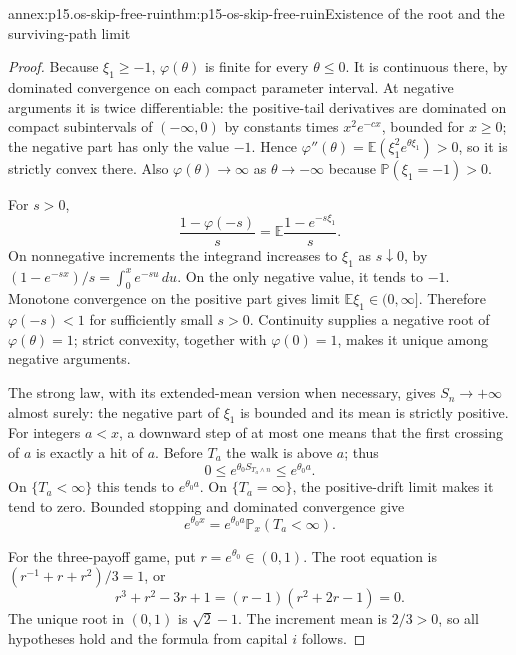 \begin{annexitem}{annex:p15.os-skip-free-ruin}{thm:p15-os-skip-free-ruin}{Existence of the root and the surviving-path limit}
\begin{proof}
Because \(\xi_1\geq-1\), \(\varphi(\theta)\) is finite
for every \(\theta\leq0\). It is continuous there, by
dominated convergence on each compact parameter interval.
At negative arguments it is twice differentiable: the
positive-tail derivatives are dominated on compact subintervals
of \((-\infty,0)\) by constants times \(x^2e^{-cx}\),
bounded for \(x\geq0\); the negative part has only the value
\(-1\). Hence
\(\varphi''(\theta)=\mathbb E(\xi_1^2e^{\theta\xi_1})>0\),
so it is strictly convex there.
Also \(\varphi(\theta)\to\infty\) as \(\theta\to-\infty\)
because \(\mathbb P(\xi_1=-1)>0\).

For \(s>0\),
\[
 \frac{1-\varphi(-s)}s
 =\mathbb E\frac{1-e^{-s\xi_1}}s.
 \]
On nonnegative increments the integrand increases to \(\xi_1\)
as \(s\downarrow0\), by
\((1-e^{-sx})/s=\int_0^x e^{-su}\,du\).
On the only negative value, it tends to \(-1\).
Monotone convergence on the positive part gives limit
\(\mathbb E\xi_1\in(0,\infty]\).
Therefore \(\varphi(-s)<1\) for sufficiently small \(s>0\).
Continuity supplies a negative root of \(\varphi(\theta)=1\);
strict convexity, together with \(\varphi(0)=1\), makes it
unique among negative arguments.

The strong law, with its extended-mean version when necessary,
gives \(S_n\to+\infty\) almost surely: the negative part of
\(\xi_1\) is bounded and its mean is strictly positive.
For integers \(a<x\), a downward step of at most one means
that the first crossing of \(a\) is exactly a hit of \(a\).
Before \(T_a\) the walk is above \(a\); thus
\[
 0\leq e^{\theta_0S_{T_a\wedge n}}\leq e^{\theta_0a}.
 \]
On \(\{T_a<\infty\}\) this tends to \(e^{\theta_0a}\).
On \(\{T_a=\infty\}\), the positive-drift limit makes it tend
to zero. Bounded stopping and dominated convergence give
\[
 e^{\theta_0x}
     =e^{\theta_0a}\mathbb P_x(T_a<\infty).
 \]

For the three-payoff game, put \(r=e^{\theta_0}\in(0,1)\).
The root equation is
\((r^{-1}+r+r^2)/3=1\), or
\[
 r^3+r^2-3r+1=(r-1)(r^2+2r-1)=0.
 \]
The unique root in \((0,1)\) is \(\sqrt2-1\).
The increment mean is \(2/3>0\), so all hypotheses hold
and the formula from capital \(i\) follows.
\end{proof}
\end{annexitem}

